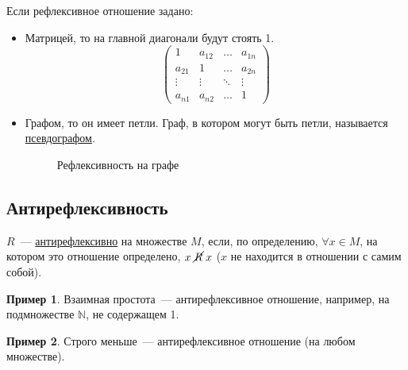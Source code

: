 \documentclass[russian]{lecture-notes}
\theoremstyle{definition}
\newtheorem{example*}{Пример}[subsection]
\newcommand{\unrelation}[2]{$#1\mathrel{\cancel{R}}#2$}
\begin{document}
Если рефлексивное отношение задано:
\begin{itemize}
	\item Матрицей, то на главной диагонали будут стоять 1.
	\begin{equation*}
	\left(
	\begin{array}{cccc}
	1 & a_{12} & \ldots & a_{1n}\\
	a_{21} & 1 & \ldots & a_{2n}\\
	\vdots & \vdots & \ddots & \vdots\\
	a_{n1} & a_{n2} & \ldots & 1
	\end{array}
	\right)
	\end{equation*}
	
	\newpage
	
	\item Графом, то он имеет петли. Граф, в котором могут быть петли, называется \underline{псевдографом}.
	
	\begin{figure}[H]
		\centering
		\caption{Рефлексивность на графе}
		\label{fig:refleks}
	\end{figure}

\end{itemize}

\subsection{Антирефлексивность \label{opr:antirefleks}}
\begin{definition}
	$R$~--- \underline{антирефлексивно} на множестве $M$, если, по определению, $\forall x \in M$, на котором это отношение определено, \unrelation{x}{x} ($x$ не находится в отношении с самим собой).
\end{definition}

\begin{example*}
	Взаимная простота~--- антирефлексивное отношение, например, на подмножестве $\mathbb{N}$, не содержащем 1.
\end{example*}

\begin{example*}
	Строго меньше~--- антирефлексивное отношение (на любом множестве).
\end{example*}
\end{document}
